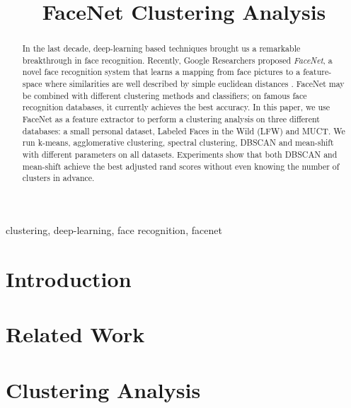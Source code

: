 \documentclass[conference]{IEEEtran}
\begin{document}
\title{FaceNet Clustering Analysis}

\author{
}


\maketitle

\begin{abstract}
In the last decade, deep-learning based techniques brought us a remarkable breakthrough in face recognition.
Recently, Google Researchers proposed \textit{FaceNet}, a novel face recognition system that learns a mapping from face pictures to a feature-space where similarities are well described by simple euclidean distances \cite{??}.
FaceNet may be combined with different clustering methods and classifiers; on famous face recognition databases, it currently achieves the best accuracy.
In this paper, we use FaceNet as a feature extractor to perform a clustering analysis on three different databases: a small personal dataset, Labeled Faces in the Wild (LFW) and MUCT.
We run k-means, agglomerative clustering, spectral clustering, DBSCAN and mean-shift with different parameters on all datasets.
Experiments show that both DBSCAN and mean-shift achieve the best adjusted rand scores without even knowing the number of clusters in advance.

\end{abstract}

\begin{IEEEkeywords}
clustering, deep-learning, face recognition, facenet
\end{IEEEkeywords}

\section{Introduction}

\section{Related Work}

\section{Clustering Analysis}
\end{document}
